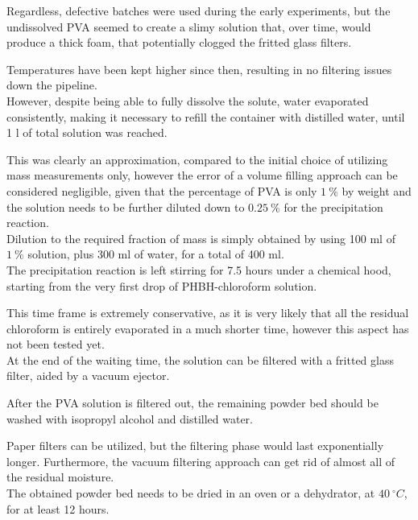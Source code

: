 \documentclass{article}
\begin{document}
        Regardless, defective batches were used during the early experiments, but the undissolved PVA 
        seemed to create a slimy solution that, over time, would produce a thick foam, that potentially clogged 
        the fritted glass filters. 

        Temperatures have been kept higher since then, resulting in no filtering issues down the pipeline. \\ 

        However, despite being able to fully dissolve the solute, water evaporated consistently, making it necessary to refill the 
        container with distilled water, until 1 l of total solution was reached. 

        This was clearly an approximation, compared to the initial choice of utilizing mass measurements only, however 
        the error of a volume filling approach can be considered negligible, given that the 
        percentage of PVA is only $1 \ \%$ by weight and the solution needs to be further diluted down to $0.25 \ \%$ for 
        the precipitation reaction. \\ 

        Dilution to the required fraction of mass is simply obtained by using 100 ml of $1 \ \%$ solution, 
        plus 300 ml of water, for a total of 400 ml. \\ 

        The precipitation reaction is left stirring for 7.5 hours under a 
        chemical hood, starting from the very first drop of PHBH-chloroform solution. 

        This time frame is extremely conservative, as it is very likely that all the residual chloroform is entirely 
        evaporated in a much shorter time, however this aspect has not been tested yet. \\

        At the end of the waiting time, the solution can be filtered with a fritted glass filter, aided by a vacuum 
        ejector. 

        After the PVA solution is filtered out, the remaining powder bed should be washed with isopropyl alcohol and 
        distilled water. 

        Paper filters can be utilized, but the filtering phase would last exponentially longer. Furthermore, the vacuum filtering 
        approach can get rid of almost all of the residual moisture. \\ 

        The obtained powder bed needs to be dried in an oven or a dehydrator, at $40 \ ^{\circ}C$, for at least 12 hours. \\ 
\end{document}
